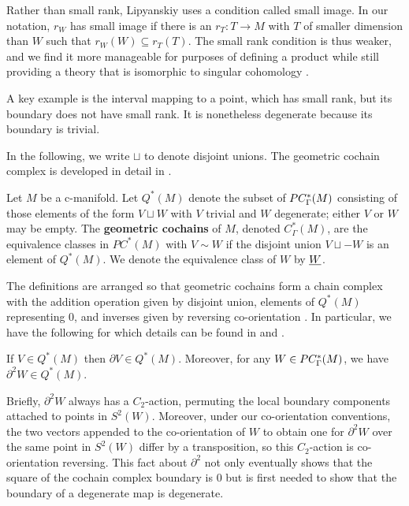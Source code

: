 Rather than small rank, Lipyanskiy uses a condition called small image.
In our notation, $r_W$ has small image if there is an $r_T \colon T \to M$ with $T$ of smaller dimension than $W$ such that $r_W(W) \subseteq r_T(T)$.
The small rank condition is thus weaker, and we find it more manageable for purposes of defining a product while still providing a theory that is isomorphic to singular cohomology \cite[Theorem 5.34]{medina2022foundations}.

A key example is the interval mapping to a point, which has small rank, but its boundary does not have small rank.
It is nonetheless degenerate because its boundary is trivial.

In the following, we write $\sqcup$ to denote disjoint unions.
The geometric cochain complex is developed in detail in \cite[Section 4.2]{medina2022foundations}.

\begin{definition}\label{D:geometric cohomology}
	Let $M$ be a c-manifold.
	Let $Q^*(M)$ denote the subset of $PC_\Gamma^*(M)$ consisting of those elements of the form $V \sqcup W$ with $V$ trivial and $W$ degenerate; either $V$ or $W$ may be empty.
	The \textbf{geometric cochains} of $M$, denoted $C_\Gamma^*(M)$, are the equivalence classes in $PC^*(M)$ with $V \sim W$ if the disjoint union $V \sqcup -W$ is an element of $Q^*(M)$.
	We denote the equivalence class of $W$ by $\underline{W}$.
\end{definition}

The definitions are arranged so that geometric cochains form a chain complex with the addition operation given by disjoint union, elements of $Q^*(M)$ representing $0$, and inverses given by reversing co-orientation \cite[Lemma 4.19]{medina2022foundations}.
In particular, we have the following for which details can be found in \cite{Lipy14} and \cite[Lemma 3.26]{medina2022foundations}.

\begin{proposition}
	If $V \in Q^*(M)$ then $\partial V \in Q^*(M)$.
	Moreover, for any $W \in PC_\Gamma^*(M)$, we have $\partial^2 W \in Q^*(M)$.
\end{proposition}

Briefly, $\partial^2 W$ always has a $C_2$-action, permuting the local boundary components attached to points in $S^2(W)$.
Moreover, under our co-orientation conventions, the two vectors appended to the co-orientation of $W$ to obtain one for $\partial^2 W$ over the same point in $S^2(W)$ differ by a transposition, so this $C_2$-action is co-orientation reversing.
This fact about $\partial^2$ not only eventually shows that the square of the cochain complex boundary is $0$ but is first needed to show that the boundary of a degenerate map is degenerate.

